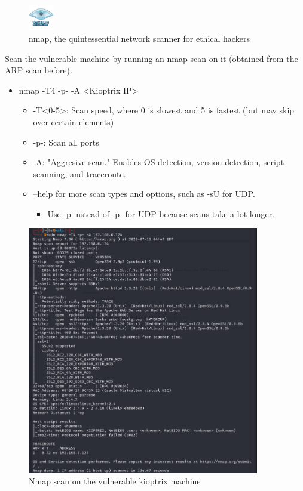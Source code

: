 \documentclass[a4paper,11pt]{article}
\renewcommand{\tt}[2][tt]{\textcolor{#1}{\ttfamily #2}}%
\begin{document}
\begin{figure}[h]
    \centering
    \includegraphics[width=0.1\textwidth]{images/nmap.png}
    \caption{\tt{nmap}, the quintessential network scanner for ethical hackers}
    \label{fig:nmap}
\end{figure}
\pagebreak

Scan the vulnerable machine by running an nmap scan on it (obtained from the ARP scan before).
\begin{itemize}
    \item \tt{nmap -T4 -p- -A <Kioptrix IP>}
    \begin{itemize}
        \item \tt{-T<0-5>}: Scan speed, where 0 is slowest and 5 is fastest (but may skip over certain elements)
        \item \tt{-p-}: Scan all ports
        \item \tt{-A}: "Aggresive scan." Enables OS detection, version detection, script scanning, and traceroute.
        \item \tt{--help} for more scan types and options, such as \tt{-sU} for UDP.
        \begin{itemize}
            \item Use \tt{-p} instead of \tt{-p-} for UDP because scans take a lot longer.
        \end{itemize}
    \end{itemize}
\end{itemize}

\begin{figure}[h]
    \vspace{-0.5cm}
    \centering
    \includegraphics[width=0.9\textwidth]{images/nmapk1.png}
    \caption{Nmap scan on the vulnerable kioptrix machine}
    \label{fig:nmapk1}
    \vspace{-1cm}
\end{figure}
\pagebreak
\end{document}
